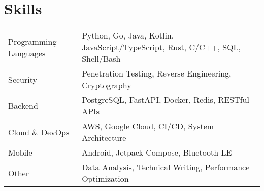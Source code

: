 \section{Skills}
\begin{tabularx}{\linewidth}{@{}l X@{}}
	Programming Languages & \normalsize{Python, Go, Java, Kotlin, JavaScript/TypeScript, Rust, C/C++, SQL, Shell/Bash} \\
	Security              & \normalsize{Penetration Testing, Reverse Engineering, Cryptography}                        \\
	Backend               & \normalsize{PostgreSQL, FastAPI, Docker, Redis, RESTful APIs}                              \\
	Cloud \& DevOps       & \normalsize{AWS, Google Cloud, CI/CD, System Architecture}                                 \\
	Mobile                & \normalsize{Android, Jetpack Compose, Bluetooth LE}                                        \\
	Other                 & \normalsize{Data Analysis, Technical Writing, Performance Optimization}                    \\
\end{tabularx}
